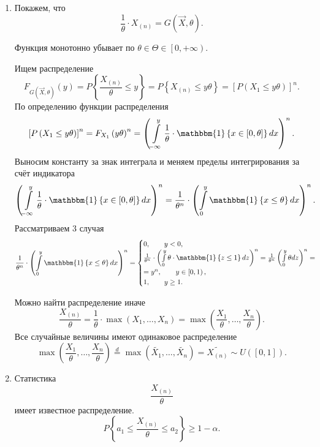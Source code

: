 \begin{enumerate}[label=\alph*)]
  \item Покажем, что
  $$ \frac{1}{ \theta } \cdot X_{ \left( n \right) } =
    G \left( \vec{X}, \theta \right).$$

  Функция монотонно убывает по $ \theta \in \Theta \in \left[ 0, + \infty \right) $.

  Ищем распределение
  $$F_{G \left( \vec{X}, \theta \right) } \left( y \right) =
    P \left\{ \frac{X_{ \left( n \right) }}{ \theta } \leq y \right\} =
    P \left\{ X_{ \left( n \right) } \leq y \theta \right\} =
    \left[ P \left( X_1 \leq y \theta \right) \right]^n.$$
  По определению функции распределения
  $$ \left[ P \left( X_1 \leq y \theta \right) \right]^n =
    F_{X_1} \left( y \theta \right)^n =
    \left(
      \int \limits_{- \infty }^y
        \frac{1}{ \theta } \cdot \mathbbm{1} \left\{ x \in \left[ 0, \theta \right] \right\}
      dx
    \right)^n.$$
  Выносим константу за знак интеграла и меняем пределы интегрирования за счёт индикатора
  $$ \left(
      \int \limits_{- \infty }^y
        \frac{1}{ \theta } \cdot \mathbbm{1} \left\{ x \in \left[ 0, \theta \right] \right\}
      dx
    \right)^n =
    \frac{1}{ \theta^n } \cdot
    \left( \int \limits_0^y \mathbbm{1} \left\{ x \leq \theta \right\} dx \right)^n.$$
  Рассматриваем 3 случая
  \begin{equation*}
    \begin{split}
      \frac{1}{ \theta^n } \cdot
      \left( \int \limits_0^y \mathbbm{1} \left\{ x \leq \theta \right\} dx \right)^n =
      \begin{cases}
        0, \qquad y < 0, \\
        \frac{1}{ \theta^n} \cdot
        \left( \int \limits_0^y \theta \cdot \mathbbm{1} \left\{ z \leq 1 \right\} dz \right)^n =
        \frac{1}{ \theta^n} \left( \int \limits_0^y \theta dz \right)^n = \\
        = y^n, \qquad y \in \left[ 0, 1 \right), \\
        1, \qquad y \geq 1.
      \end{cases}
    \end{split}
  \end{equation*}

  Можно найти распределение иначе
  $$ \frac{X_{ \left( n \right) }}{ \theta } =
    \frac{1}{ \theta } \cdot \max \left( X_1, \dotsc, X_n \right) =
    \max \left( \frac{X_1}{ \theta }, \dotsc, \frac{X_n}{ \theta } \right).$$
  Все случайные величины имеют одинаковое распределение
  $$ \max \left( \frac{X_1}{ \theta }, \dotsc, \frac{X_n}{ \theta } \right) \overset{d}{=}
    \max \left( \tilde{X_1}, \dotsc, \tilde{X_n} \right) =
    \tilde{X_{ \left( n \right) }} \sim
    U \left( \left[ 0, 1 \right] \right).$$
  \item Статистика
  $$ \frac{X_{ \left( n \right) }}{ \theta }$$
  имеет известное распределение.
  $$P \left\{ a_1 \leq \frac{X_{ \left( n \right) }}{ \theta } \leq a_2 \right\} \geq
    1 - \alpha.$$


\end{enumerate}
